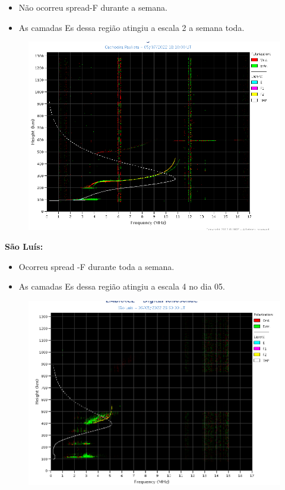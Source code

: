 \documentclass[11pt, oneside]{article}
\begin{document}
 \begin{itemize}
\item Não ocorreu spread-F durante a semana.
\item As camadas Es dessa região atingiu a escala 2 a semana toda. 
\end{itemize}
\begin{figure}[H]
    \centering
    \includegraphics[width=14cm]{./figures//CachoeiraPaulista.png}
\end{figure}

\textbf{São Luís: }

 \begin{itemize}
\item Ocorreu spread -F durante toda a semana. 
\item As camadas Es dessa região atingiu a escala 4 no dia 05. 
\end{itemize}
\begin{figure}[H]
    \centering
    \includegraphics[width=14cm]{./figures//SãoLuís.png}
\end{figure}
\end{document}
